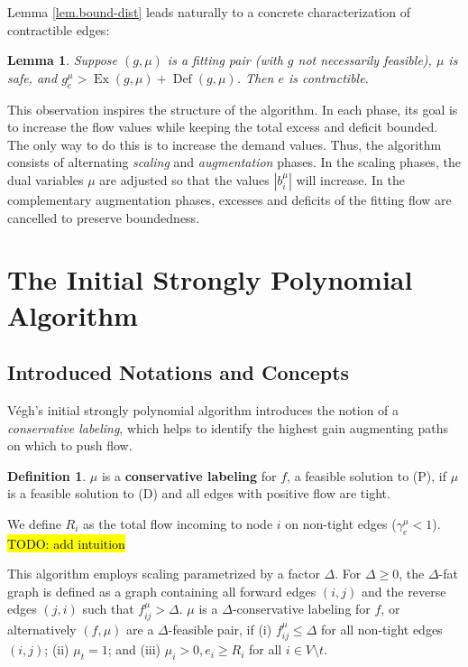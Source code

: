 \documentclass[11pt]{article}
\newtheorem{lemma}[theorem]{Lemma}
\theoremstyle{definition}
\newtheorem{definition}{Definition}[section]
\theoremstyle{definition}
\newcommand{\biu}{b_{i}^{\mu}}
\newcommand{\geu}{\gamma_e^{\mu}}
\DeclareMathOperator{\Ex}{Ex}
\DeclareMathOperator{\Def}{Def}
\newcommand{\todo}[1]{\hl{TODO: #1}}
\begin{document}
    Lemma \ref{lem.bound-dist} leads naturally to a concrete characterization of contractible edges:
    \begin{lemma} \label{lem.contractibility}
    Suppose $(g, \mu)$ is a fitting pair (with $g$ not necessarily feasible),
    $\mu$ is safe, and $g^\mu_e > \Ex(g, \mu) + \Def(g, \mu)$.
    Then $e$ is contractible.
    \end{lemma}
    
    This observation inspires the structure of the algorithm. In each phase, its
    goal is to increase the flow values while keeping the total excess and deficit
    bounded. The only way to do this is to increase the demand values. Thus, the algorithm
    consists of alternating \emph{scaling} and \emph{augmentation} phases. In the scaling phases, the
    dual variables $\mu$ are adjusted so that the values $|\biu|$ will increase. In the
    complementary augmentation phases, excesses and deficits of the fitting flow are
    cancelled to preserve boundedness.
	

\section{The Initial Strongly Polynomial Algorithm}
	\subsection{Introduced Notations and Concepts}
	Végh's initial strongly polynomial algorithm \cite{Vegh2013}
	introduces the notion of a \textit{conservative labeling}, which helps to
	identify the highest gain augmenting paths on which to push flow.
	\begin{definition}
	$\mu$ is a \textbf{conservative labeling} for $f$, a feasible solution to (P), if $\mu$ is
	a feasible solution to (D) and all edges with positive flow are tight.
	\end{definition}
	We define $R_i$ as the total flow incoming to node $i$ on non-tight edges
	($\geu < 1$). \todo{add intuition}
	
	This algorithm employs scaling parametrized by a factor $\Delta$.
	For $\Delta \geq 0$, the $\Delta$-fat graph is defined as a graph containing all
	forward edges $(i, j)$ and the reverse edges $(j, i)$ such that $f_{ij}^\mu > \Delta$. $\mu$
	is a $\Delta$-conservative labeling for $f$, or alternatively $(f, \mu)$ are a
	$\Delta$-feasible pair, if (i) $f_{ij}^\mu \leq \Delta$ for all non-tight edges $(i, j)$;
	(ii) $\mu_t = 1$; and (iii) $\mu_i > 0, e_i \geq R_i$ for all $i \in V \setminus t$.
    
\end{document}
